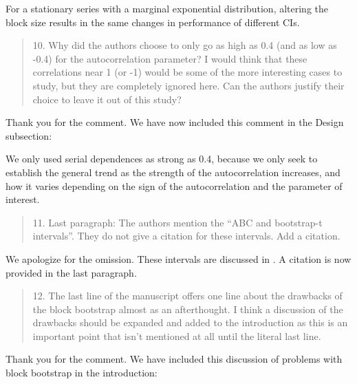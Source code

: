 \documentclass[12pt]{article}
\newenvironment{comment}%
{\begin{quotation}\noindent\small\it\color{darkblue}\ignorespaces%
}{\end{quotation}}
\begin{document}
For a stationary series with a marginal exponential distribution, altering the 
block size results in the same 
changes in performance of different CIs.


\begin{comment}
10.   Why did the authors choose to only go as high as 0.4 (and as low as -0.4) 
for the autocorrelation parameter?  I would think that these correlations near 1 
(or -1) would be some of the more interesting cases to study, but they are 
completely ignored here.  Can the authors justify their choice to leave it out 
of this study?
\end{comment}

Thank you for the comment. We have now included this comment in the Design 
subsection:

We only
used serial dependences as strong as 0.4, because we only seek to 
establish the 
general trend as the strength of the autocorrelation 
increases, and how it varies depending on the sign of the autocorrelation and 
the parameter of interest.

\begin{comment}
11.    Last paragraph: The authors mention the “ABC and bootstrap-t intervals”.  
They do not give a citation for these intervals.   Add a citation. 
\end{comment}

We apologize for the omission. These intervals are discussed in 
\citep{efron1993introduction}. A citation is now provided in the last paragraph.



\begin{comment}
12.    The last line of the manuscript offers one line about the drawbacks of 
the block bootstrap almost as an afterthought.  I think a discussion of the 
drawbacks should be expanded and added to the introduction as this is an 
important point that isn’t mentioned at all until the literal last line. 
\end{comment}

Thank you for the comment. We have included this discussion of problems 
with block bootstrap in the introduction:
\end{document}
